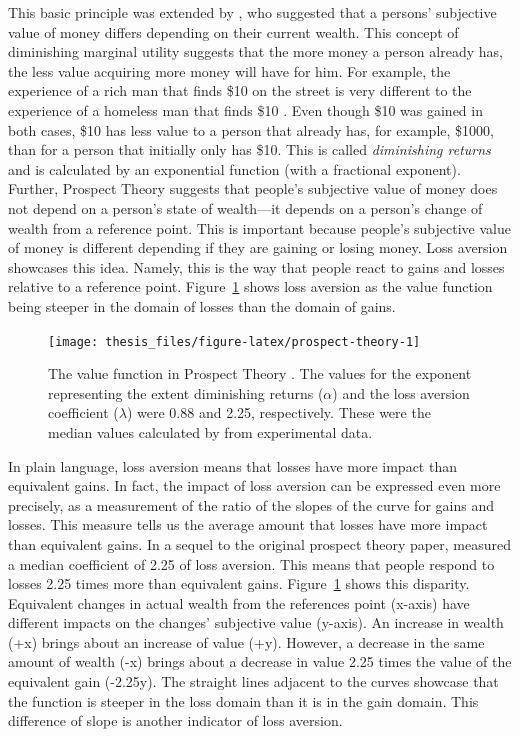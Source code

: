 \documentclass[a4paper, nobind, dvipsnames]{templates/ociamthesis}
\theoremstyle{definition}
\theoremstyle{definition}
\theoremstyle{definition}
\theoremstyle{definition}
\theoremstyle{remark}
\begin{document}
This basic principle was extended by \textcite{bernoulli1954}, who suggested that a
persons' subjective value of money differs depending on their current wealth.
This concept of diminishing marginal utility suggests that the more money a
person already has, the less value acquiring more money will have for him. For
example, the experience of a rich man that finds \$10 on the street is very
different to the experience of a homeless man that finds \$10 \autocite{bradley2013}.
Even though \$10 was gained in both cases, \$10 has less value to a person that
already has, for example, \$1000, than for a person that initially only has \$10.
This is called \emph{diminishing returns} and is calculated by an exponential
function (with a fractional exponent). Further, Prospect Theory \autocite{kahneman1979}
suggests that people's subjective value of money does not depend on a person's
state of wealth---it depends on a person's change of wealth from a reference
point. This is important because people's subjective value of money is different
depending if they are gaining or losing money. Loss aversion showcases this
idea. Namely, this is the way that people react to gains and losses relative to
a reference point. Figure~\ref{fig:prospect-theory} shows loss aversion as the
value function being steeper in the domain of losses than the domain of gains.



\begin{figure}
\texttt{[image: thesis\_files/figure-latex/prospect-theory-1]} \caption{The value function in Prospect Theory \autocite[adapted from][]{kahneman1979}. The values for the exponent representing the extent diminishing returns (\(\alpha\)) and the loss aversion coefficient (\(\lambda\)) were 0.88 and 2.25, respectively. These were the median values calculated by \textcite{tversky1992} from experimental data.}\label{fig:prospect-theory}
\end{figure}

In plain language, loss aversion means that losses have more impact than
equivalent gains. In fact, the impact of loss aversion can be expressed even
more precisely, as a measurement of the ratio of the slopes of the curve for
gains and losses. This measure tells us the average amount that losses have more
impact than equivalent gains. In a sequel to the original prospect theory paper,
\textcite{tversky1992} measured a median coefficient of 2.25 of loss aversion. This means
that people respond to losses 2.25 times more than equivalent gains.
Figure~\ref{fig:prospect-theory} shows this disparity. Equivalent changes in
actual wealth from the references point (x-axis) have different impacts on the
changes' subjective value (y-axis). An increase in wealth (+x) brings about an
increase of value (+y). However, a decrease in the same amount of wealth (-x)
brings about a decrease in value 2.25 times the value of the equivalent gain
(-2.25y). The straight lines adjacent to the curves showcase that the function
is steeper in the loss domain than it is in the gain domain. This difference of
slope is another indicator of loss aversion.
\end{document}
